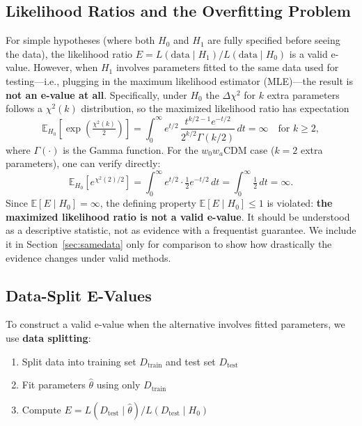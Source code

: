 \documentclass[11pt,a4paper]{article}
\newcommand{\E}{\mathbb{E}}
\begin{document}
\subsection{Likelihood Ratios and the Overfitting Problem}

For simple hypotheses (where both $H_0$ and $H_1$ are fully specified before seeing the data), the likelihood ratio $E = L(\text{data} \mid H_1) / L(\text{data} \mid H_0)$ is a valid e-value. However, when $H_1$ involves parameters fitted to the same data used for testing---i.e., plugging in the maximum likelihood estimator (MLE)---the result is \textbf{not an e-value at all}. Specifically, under $H_0$ the $\Delta\chi^2$ for $k$ extra parameters follows a $\chi^2(k)$ distribution, so the maximized likelihood ratio has expectation
\begin{equation}
\E_{H_0}\!\left[\exp\!\left(\tfrac{\chi^2(k)}{2}\right)\right] = \int_0^\infty e^{t/2}\,\frac{t^{k/2-1}e^{-t/2}}{2^{k/2}\Gamma(k/2)}\,dt = \infty \quad \text{for } k \geq 2,
\end{equation}
where $\Gamma(\cdot)$ is the Gamma function. For the $w_0w_a$CDM case ($k=2$ extra parameters), one can verify directly:
\begin{equation}
\E_{H_0}\!\left[e^{\chi^2(2)/2}\right] = \int_0^\infty e^{t/2}\cdot\tfrac{1}{2}e^{-t/2}\,dt = \int_0^\infty \tfrac{1}{2}\,dt = \infty.
\end{equation}
Since $\E[E \mid H_0] = \infty$, the defining property $\E[E \mid H_0] \leq 1$ is violated: \textbf{the maximized likelihood ratio is not a valid e-value}. It should be understood as a descriptive statistic, not as evidence with a frequentist guarantee. We include it in Section~\ref{sec:samedata} only for comparison to show how drastically the evidence changes under valid methods.

\subsection{Data-Split E-Values}

To construct a valid e-value when the alternative involves fitted parameters, we use \textbf{data splitting}:
\begin{enumerate}
    \item Split data into training set $D_{\text{train}}$ and test set $D_{\text{test}}$
    \item Fit parameters $\hat{\theta}$ using only $D_{\text{train}}$
    \item Compute $E = L(D_{\text{test}} \mid \hat{\theta}) / L(D_{\text{test}} \mid H_0)$
\end{enumerate}
\end{document}
